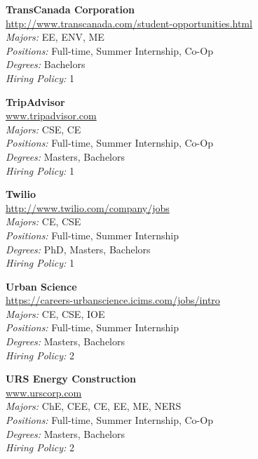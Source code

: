 \documentclass{article}
\begin{document}
\begin{center}
\begin{multicols}{3}
\begin{minipage}{.9\columnwidth}{\Large\bf TransCanada Corporation }\\
	\url{http://www.transcanada.com/student-opportunities.html}\\
	\emph{Majors:} EE, ENV, ME\\
	\emph{Positions:} Full-time, Summer Internship, Co-Op\\
	\emph{Degrees:} Bachelors\\
	\emph{Hiring Policy:} 1\\
\end{minipage}
 
\begin{minipage}{.9\columnwidth}{\Large\bf TripAdvisor }\\
	\url{www.tripadvisor.com}\\
	\emph{Majors:} CSE, CE\\
	\emph{Positions:} Full-time, Summer Internship, Co-Op\\
	\emph{Degrees:} Masters, Bachelors\\
	\emph{Hiring Policy:} 1\\
\end{minipage}
 
\begin{minipage}{.9\columnwidth}{\Large\bf Twilio }\\
	\url{http://www.twilio.com/company/jobs}\\
	\emph{Majors:} CE, CSE\\
	\emph{Positions:} Full-time, Summer Internship\\
	\emph{Degrees:} PhD, Masters, Bachelors\\
	\emph{Hiring Policy:} 1\\
\end{minipage}
 
\begin{minipage}{.9\columnwidth}{\Large\bf Urban Science }\\
	\url{https://careers-urbanscience.icims.com/jobs/intro}\\
	\emph{Majors:} CE, CSE, IOE\\
	\emph{Positions:} Full-time, Summer Internship\\
	\emph{Degrees:} Masters, Bachelors\\
	\emph{Hiring Policy:} 2\\
\end{minipage}
 
\begin{minipage}{.9\columnwidth}{\Large\bf URS Energy Construction }\\
	\url{www.urscorp.com}\\
	\emph{Majors:} ChE, CEE, CE, EE, ME, NERS\\
	\emph{Positions:} Full-time, Summer Internship, Co-Op\\
	\emph{Degrees:} Masters, Bachelors\\
	\emph{Hiring Policy:} 2\\
\end{minipage}
 

\end{multicols}
\end{center}
\end{document}
